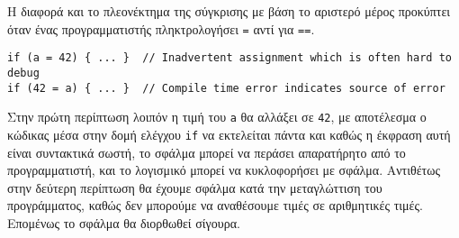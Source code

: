 Η διαφορά και το πλεονέκτημα της σύγκρισης με βάση το αριστερό μέρος προκύπτει όταν ένας προγραμματιστής πληκτρολογήσει \lstinline!=! αντί για \lstinline!==!. 

\begin{lstlisting}[style=cpp,caption= Παράδειγμα σύγκρισης με βάση το αριστερό μέλος (2), label=program:left-comparison(2)]
if (a = 42) { ... }  // Inadvertent assignment which is often hard to debug
if (42 = a) { ... }  // Compile time error indicates source of error 
\end{lstlisting}

Στην πρώτη περίπτωση λοιπόν η τιμή του \lstinline!a! θα αλλάξει σε \lstinline!42!, με αποτέλεσμα ο κώδικας μέσα στην δομή ελέγχου \lstinline!if! να εκτελείται πάντα και καθώς η έκφραση αυτή είναι συντακτικά σωστή, το σφάλμα μπορεί να περάσει απαρατήρητο από το προγραμματιστή, και το λογισμικό μπορεί να κυκλοφορήσει με σφάλμα. Αντιθέτως στην δεύτερη περίπτωση θα έχουμε σφάλμα κατά την μεταγλώττιση του προγράμματος, καθώς δεν μπορούμε να αναθέσουμε τιμές σε αριθμητικές τιμές. Επομένως το σφάλμα θα διορθωθεί σίγουρα.
